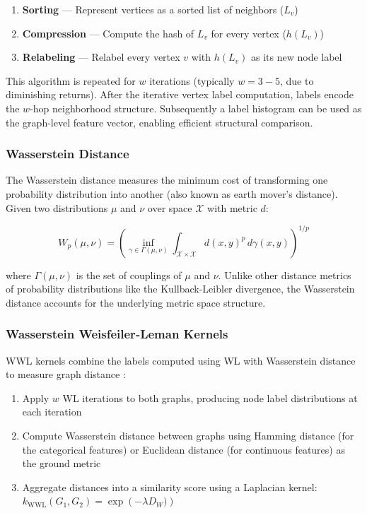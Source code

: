 \begin{enumerate}
    \item \textbf{Sorting} — Represent vertices as a sorted list of neighbors
        ($L_v$)
    \item \textbf{Compression} — Compute the hash of $L_v$ for every vertex
        ($h(L_v)$)
    \item \textbf{Relabeling} — Relabel every vertex $v$ with $h(L_v)$ as its
        new node label
\end{enumerate}

This algorithm is repeated for $w$ iterations (typically $w = 3-5$, due to
diminishing returns). After the iterative vertex label computation, labels
encode the $w$-hop neighborhood structure. Subsequently a label histogram can
be used as the graph-level feature vector, enabling efficient structural
comparison.

\subsubsection{Wasserstein Distance}

The Wasserstein distance measures the minimum cost of transforming one
probability distribution into another (also known as earth mover's distance).
Given two distributions $\mu$ and $\nu$ over space $\mathcal{X}$ with metric $d$:

\begin{equation}
W_p(\mu, \nu) = \left(\inf_{\gamma \in \Gamma(\mu, \nu)} \int_{\mathcal{X} \times \mathcal{X}} d(x, y)^p \, d\gamma(x, y)\right)^{1/p}
\end{equation}

where $\Gamma(\mu, \nu)$ is the set of couplings of $\mu$ and $\nu$.
Unlike other distance metrics of probability distributions like the
Kullback-Leibler divergence, the Wasserstein distance accounts for the
underlying metric space structure.

\subsubsection{Wasserstein Weisfeiler-Leman Kernels}

WWL kernels combine the labels computed using WL with Wasserstein distance to
measure graph distance \citep{WWL}:

\begin{enumerate}
    \item Apply $w$ WL iterations to both graphs, producing node label
        distributions at each iteration
    \item Compute Wasserstein distance between graphs using Hamming distance
        (for the categorical features) or Euclidean distance (for continuous
        features) as the ground metric
    \item Aggregate distances into a similarity score using a Laplacian kernel:\\
        $k_{\text{WWL}}(G_1, G_2) = \exp\left(-\lambda  D_W)\right)$
\end{enumerate}

